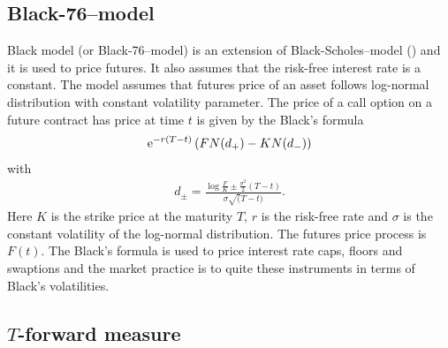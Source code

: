 \iffalse
	
\subsubsection{Black-Scholes--model with continuous dividend yield}

If $X(t)$ is the price of call option on stock $S(t)$ with strike $K$ at the time $T$ that pays continuous dividend yield $q$, then the extension of Black-Scholes--model gives the price
	\begin{align}
		X(t) &= \e^{-r(T-t)} \left( F(t)N(d_+) - KN(d_-) \right), \\
		F(t) &= S(t)  \e^{(r-q)(T-t)}, \\
		d_{\pm} &= \frac{\log \frac{S(t)}{K} + (r-q \pm \frac{1}{2} \sigma^2)(T-t)}{\sigma \sqrt{T-t}}		
	\end{align}
	
Suppose now that assets $S_i(t)$ pay continuous dividend yields $q_i$. Suppose that an option gives right to swap asset $S_1$ with asset $S_2$ at the time $T$. 

\fi

\subsection{Black-76--model}
\label{blackformula}

Black model (or Black-76--model) is an extension of Black-Scholes--model (\cite{black1976pricing}) and it is used to price futures. It also assumes that the risk-free interest rate is a constant. The model assumes that futures price of an asset follows log-normal distribution with constant volatility parameter. The price of a call option on a future contract has price at time $t$ is given by the Black's formula
\begin{align}
\mathrm{e}^{-r(T-t)} \left( F N(d_+) - K N(d_-) \right)
\end{align}
with
\begin{align}
d_{\pm} = \frac{\log \frac{F}{K} \pm \frac{\sigma^2}{2} (T-t) }{ \sigma \sqrt(T-t) } .
\end{align}
Here $K$ is the strike price at the maturity $T$, $r$ is the risk-free rate and $\sigma$ is the constant volatility of the log-normal distribution. The futures price process is $F(t)$. The Black's formula is used to price interest rate caps, floors and swaptions and the market practice is to quite these instruments in terms of Black's volatilities.
	
\subsection{$T$-forward measure}

